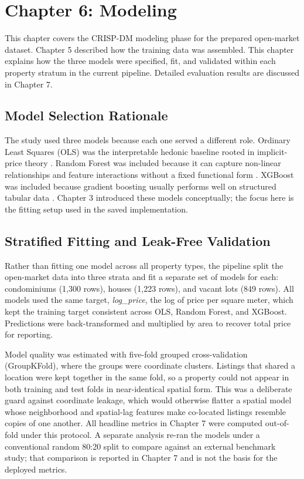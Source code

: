 \section{Chapter 6: Modeling}\label{modeling}

This chapter covers the CRISP-DM modeling phase for the prepared open-market dataset. Chapter 5 described how the training data was assembled. This chapter explains how the three models were specified, fit, and validated within each property stratum in the current pipeline. Detailed evaluation results are discussed in Chapter 7.

\subsection{Model Selection Rationale}\label{chapter6-model-selection-rationale}

The study used three models because each one served a different role. Ordinary Least Squares (OLS) was the interpretable hedonic baseline rooted in implicit-price theory \parencite{rosen1974}. Random Forest was included because it can capture non-linear relationships and feature interactions without a fixed functional form \parencite{breiman2001}. XGBoost was included because gradient boosting usually performs well on structured tabular data \parencite{chen2016}. Chapter 3 introduced these models conceptually; the focus here is the fitting setup used in the saved implementation.


\subsection{Stratified Fitting and Leak-Free Validation}\label{stratified-fitting}

Rather than fitting one model across all property types, the pipeline split the open-market data into three strata and fit a separate set of models for each: condominiums (1{,}300 rows), houses (1{,}223 rows), and vacant lots (849 rows). All models used the same target, \emph{log\_price}, the log of price per square meter, which kept the training target consistent across OLS, Random Forest, and XGBoost. Predictions were back-transformed and multiplied by area to recover total price for reporting.

Model quality was estimated with five-fold grouped cross-validation (GroupKFold), where the groups were coordinate clusters. Listings that shared a location were kept together in the same fold, so a property could not appear in both training and test folds in near-identical spatial form. This was a deliberate guard against coordinate leakage, which would otherwise flatter a spatial model whose neighborhood and spatial-lag features make co-located listings resemble copies of one another. All headline metrics in Chapter 7 were computed out-of-fold under this protocol. A separate analysis re-ran the models under a conventional random 80:20 split to compare against an external benchmark study; that comparison is reported in Chapter 7 and is not the basis for the deployed metrics.

